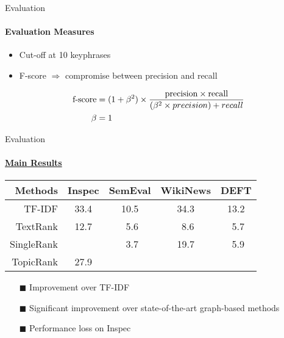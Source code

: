   \begin{frame}{Evaluation}
    \framesubtitle{Evaluation Measures}

    \begin{itemize}
      \item{Cut-off at 10 keyphrases}
      \item{F-score $\Rightarrow$ compromise between precision and recall}
    \end{itemize}

    \begin{align}
      \text{f-score} &= (1 + \beta^2) \times \frac{\text{precision} \times \text{recall}}{(\beta^2 \times precision) + recall} \notag\\
      \beta &= 1 \notag
    \end{align}
  \end{frame}

  \begin{frame}[label=main_results]{Evaluation}
    \framesubtitle{\hyperlink{main_results_backup}{Main Results}}
    
    \begin{center}
      \begin{tabular}{rcccc}
        \toprule
        Methods & Inspec & SemEval & WikiNews & DEFT\\
        \midrule
        TF-IDF & 33.4 & 10.5 & 34.3 & 13.2\\
        TextRank & 12.7 & $~~$5.6 & $~~$8.6 & $~~$5.7\\
        SingleRank & \cellcolor{pink}{35.2} & $~~$3.7 & 19.7 & $~~$5.9\\
        TopicRank & 27.9 & \cellcolor{pink}{12.1} & \cellcolor{pink}{35.6} & \cellcolor{pink}{15.1}\\
        \bottomrule
      \end{tabular}
    \end{center}

    \begin{itemize}
      \item[\footnotesize\color{green}$\blacksquare$]{Improvement over TF-IDF}
      \item[\footnotesize\color{green}$\blacksquare$]{Significant improvement
                                                      over state-of-the-art
                                                      graph-based methods}
      \item[\footnotesize\color{red}$\blacksquare$]{Performance loss on Inspec}
    \end{itemize}
  \end{frame}

